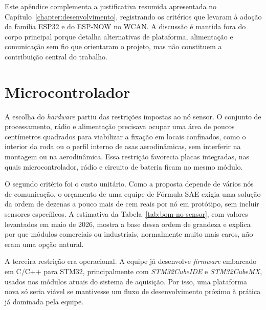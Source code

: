 Este apêndice complementa a justificativa resumida apresentada no
Capítulo~\ref{chapter:desenvolvimento}, registrando os critérios que levaram à
adoção da família ESP32 e do ESP-NOW no WCAN. A discussão é mantida fora do corpo
principal porque detalha alternativas de plataforma, alimentação e comunicação
sem fio que orientaram o projeto, mas não constituem a contribuição central do
trabalho.

\section{Microcontrolador}

A escolha do \emph{hardware} partiu das restrições impostas ao nó sensor. O conjunto de processamento, rádio e alimentação precisava ocupar uma área de poucos centímetros quadrados para viabilizar a fixação em locais confinados, como o interior da roda ou o perfil interno de asas aerodinâmicas, sem interferir na montagem ou na aerodinâmica. Essa restrição favorecia placas integradas, nas quais microcontrolador, rádio e circuito de bateria ficam no mesmo módulo.

O segundo critério foi o custo unitário. Como a proposta depende de vários nós de comunicação, o orçamento de uma equipe de Fórmula SAE exigia uma solução da ordem de dezenas a pouco mais de cem reais por nó em protótipo, sem incluir sensores específicos. A estimativa da Tabela~\ref{tab:bom-no-sensor}, com valores levantados em maio de 2026, mostra a base dessa ordem de grandeza e explica por que módulos comerciais ou industriais, normalmente muito mais caros, não eram uma opção natural.

A terceira restrição era operacional. A equipe já desenvolve \emph{firmware} embarcado em C/C++ para STM32, principalmente com \emph{STM32CubeIDE} e \emph{STM32CubeMX}, usados nos módulos atuais do sistema de aquisição. Por isso, uma plataforma nova só seria viável se mantivesse um fluxo de desenvolvimento próximo à prática já dominada pela equipe.

